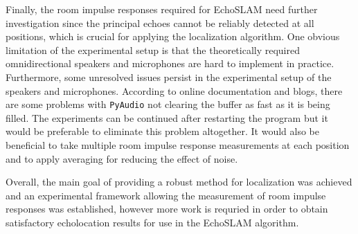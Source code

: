 Finally, the room impulse responses required for EchoSLAM need further investigation since the principal echoes cannot be reliably detected at all positions, which is crucial for applying the localization algorithm. 
One obvious limitation of the experimental setup is that the theoretically required omnidirectional speakers and microphones are hard to implement in practice.
Furthermore, some unresolved issues persist in the experimental setup of the speakers and microphones. 
According to online documentation and blogs, there are some problems with \texttt{PyAudio} not clearing the buffer as fast as it is being filled.
The experiments can be continued after restarting the program but it would be preferable to eliminate this problem altogether.
It would also be beneficial to take multiple room impulse response  measurements at each position and to apply averaging for reducing the effect of noise. 

Overall, the main goal of providing a robust method for localization was achieved and an experimental framework allowing the measurement of room impulse responses was established, however more work is requried in order to obtain satisfactory echolocation results for use in the EchoSLAM algorithm.

\setlength{\parskip}{0em}


